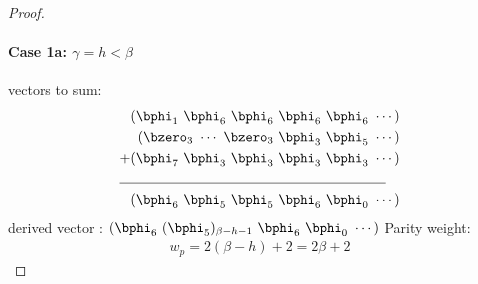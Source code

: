 \begin{proof}

\paragraph{Case 1a: $\gamma=h<\beta$ \newline}
 vectors to sum:
 \begin{align*}
(\bphi_1~\bphi_6~\bphi_6~\bphi_6~\bphi_6~\cdots)\\
(\bzero_{3}~\cdots~\bzero_{3}~\bphi_3~\bphi_5~\cdots)\\
+(\bphi_7~\bphi_3~\bphi_3~\bphi_3~\bphi_3~\cdots)\\
\cline{1-2}
(\bphi_6~\bphi_5~\bphi_5~\bphi_6~\bphi_0~\cdots)
\end{align*}
derived vector : $(\bphi_6~(\bphi_5)_{\beta-h-1}~\bphi_6~\bphi_0~\cdots)$
\newline
Parity weight: \begin{equation}
\begin{split}
w_p=2(\beta-h)+2 =2\beta+2
\end{split}
\end{equation}


\end{proof}
